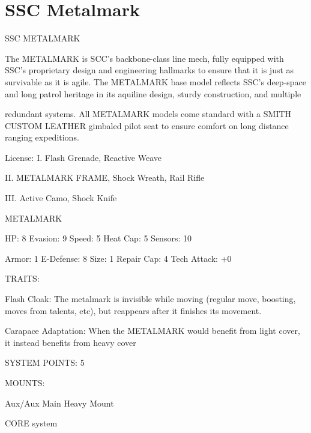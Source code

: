 
\section{SSC Metalmark}

                                             SSC METALMARK

The METALMARK is SCC’s backbone-class line mech, fully equipped with SSC’s proprietary design and
engineering hallmarks to ensure that it is just as survivable as it is agile. The METALMARK base model
reflects SSC’s deep-space and long patrol heritage in its aquiline design, sturdy construction, and multiple

redundant systems. All METALMARK models come standard with a SMITH CUSTOM LEATHER gimbaled
pilot seat to ensure comfort on long distance ranging expeditions.




                                                     License:
 I. Flash Grenade, Reactive Weave

 II. METALMARK FRAME, Shock Wreath, Rail Rifle

 III. Active Camo, Shock Knife


                                                METALMARK

  HP: 8          Evasion: 9                             Speed: 5            Heat Cap: 5         Sensors: 10

 Armor: 1        E-Defense: 8                           Size: 1             Repair Cap: 4       Tech Attack:
                                                                                                +0

                                                     TRAITS:

  Flash Cloak: The metalmark is invisible while moving (regular move, boosting, moves from talents, etc),
  but reappears after it finishes its movement.

  Carapace Adaptation: When the METALMARK would benefit from light cover, it instead benefits from
  heavy cover

                                              SYSTEM POINTS: 5

                                                    MOUNTS:

 Aux/Aux                             Main                                   Heavy Mount

                                                 CORE system

